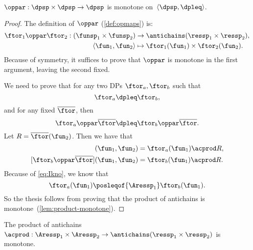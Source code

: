 \begin{lemma}
    \label{lem:par-monotone}$\oppar:\dpsp\times\dpsp\rightarrow\dpsp$
    is monotone on~$\langle\dpsp,\dpleq\rangle$.
\end{lemma}
\begin{proof}
    The definition of $\oppar$ (\cref{def:opmaps}) is:
    \begin{align*}
        \ftor_{1}\oppar\ftor_{2}:(\funsp_{1}\times\funsp_{2}) & \rightarrow\antichains(\ressp_{1}\times\ressp_{2}), \\
        \left\langle \fun_{1},\fun_{2}\right\rangle           & \mapsto\ftor_{1}(\fun_{1})\times\ftor_{2}(\fun_{2}).
    \end{align*}
    Because of symmetry, it suffices to prove that $\oppar$ is monotone
    in the first argument, leaving the second fixed.

    We need to prove that for any two DPs $\ftor_{a},\ftor_{b}$ such
    that
    \begin{equation}
        \ftor_{a}\dpleq\ftor_{b},\label{eq:Ikno}
    \end{equation}
    and for any fixed $\overline{\ftor}$, then
    \[
        \ftor_{a}\oppar\overline{\ftor}\dpleq\ftor_{b}\oppar\overline{\ftor}.
    \]
    Let $R=\overline{\ftor}(\fun_{2})$.
    Then we have that
    \begin{align*}
        [\ftor_{a}\oppar\overline{\ftor}]
        (\fun_{1},\fun_{2})
                                                             & =\ftor_{a}(\fun_{1})\acprod R,\\{}
        [\ftor_{b}\oppar\overline{\ftor}](\fun_{1},\fun_{2}) & =\ftor_{b}(\fun_{1})\acprod R.
    \end{align*}
    Because of \cref{eq:Ikno}, we know that
    \[
        \ftor_{a}(\fun_{1})\posleqof{\Aressp_{1}}\ftor_{b}(\fun_{1}).
    \]
    So the thesis follows from proving that the product of antichains
    is monotone~(\cref{lem:product-monotone}).
\end{proof}
\begin{lemma}
    \label{lem:product-monotone}
    The product of antichains~$\acprod:\Aressp_{1}\times\Aressp_{2}\rightarrow\antichains(\ressp_{1}\times\ressp_{2})$
    is monotone.
\end{lemma}

